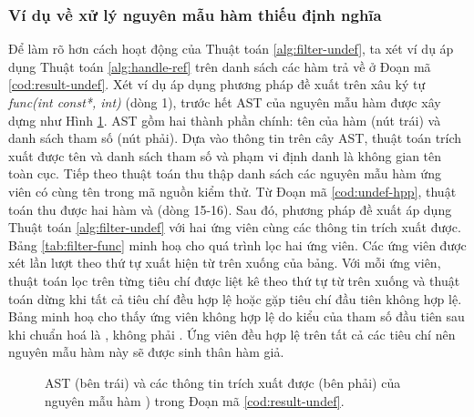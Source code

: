 \subsubsection*{Ví dụ về xử lý nguyên mẫu hàm thiếu định nghĩa}
Để làm rõ hơn cách hoạt động của Thuật toán \ref{alg:filter-undef}, ta xét ví dụ áp dụng Thuật toán \ref{alg:handle-ref} trên danh sách các hàm trả về ở Đoạn mã \ref{cod:result-undef}. Xét ví dụ áp dụng phương pháp đề xuất trên xâu ký tự \textit{func(int const*, int)} (dòng 1), trước hết AST của nguyên mẫu hàm được xây dựng như Hình \ref{fig:func-ast}. AST gồm hai thành phần chính: tên của hàm (nút trái) và danh sách tham số (nút phải). Dựa vào thông tin trên cây AST, thuật toán trích xuất được tên  và danh sách tham số  và phạm vi định danh là không gian tên toàn cục. Tiếp theo thuật toán thu thập danh sách các nguyên mẫu hàm ứng viên có cùng tên  trong mã nguồn kiểm thử. Từ Đoạn mã \ref{cod:undef-hpp}, thuật toán thu được hai hàm  và  (dòng 15-16). Sau đó, phương pháp đề xuất áp dụng Thuật toán \ref{alg:filter-undef} với hai ứng viên cùng các thông tin trích xuất được. Bảng \ref{tab:filter-func} minh hoạ cho quá trình lọc hai ứng viên. Các ứng viên được xét lần lượt theo thứ tự xuất hiện từ trên xuống của bảng. Với mỗi ứng viên, thuật toán lọc trên từng tiêu chí được liệt kê theo thứ tự từ trên xuống và thuật toán dừng khi tất cả tiêu chí đều hợp lệ hoặc gặp tiêu chí đầu tiên không hợp lệ. Bảng minh hoạ cho thấy ứng viên  không hợp lệ do kiểu của tham số đầu tiên sau khi chuẩn hoá là , không phải . Ứng viên  đều hợp lệ trên tất cả các tiêu chí nên nguyên mẫu hàm này sẽ được sinh thân hàm giả. \\
\begin{figure}[h]
    \centering
    
    \caption{AST (bên trái) và các thông tin trích xuất được (bên phải) của nguyên mẫu hàm ) trong Đoạn mã \ref{cod:result-undef}.}
    \label{fig:func-ast}
\end{figure}

